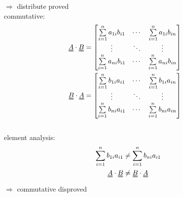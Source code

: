 \documentclass{article}
\begin{document}
$\Rightarrow$ distribute proved
\\[20pt]
commutative:
\begin{equation}\notag
\begin{aligned}
\uuline{A}\cdot\uuline{B} &=
\begin{bmatrix} 
\sum\limits_{i=1}^{n} a_{1i}b_{i1}&\cdots& \sum\limits_{i=1}^{n} a_{1i}b_{in}\\
\vdots&\ddots&\vdots\\
\sum\limits_{i=1}^{n} a_{ni}b_{i1}&\cdots& \sum\limits_{i=1}^{n} a_{ni}b_{in}
\end{bmatrix} 
\quad
\\
\uuline{B}\cdot\uuline{A} &=
\begin{bmatrix} 
\sum\limits_{i=1}^{n} b_{1i}a_{i1}&\cdots& \sum\limits_{i=1}^{n} b_{1i}a_{in}\\
\vdots&\ddots&\vdots\\
\sum\limits_{i=1}^{n} b_{ni}a_{i1}&\cdots& \sum\limits_{i=1}^{n} b_{ni}a_{in}
\end{bmatrix} 
\quad
\end{aligned}
\end{equation}
\\
element analysis:
\begin{equation}\notag
\begin{aligned}
\sum\limits_{i=1}^{n} b_{1i}a_{i1} &\neq \sum\limits_{i=1}^{n} b_{ni}a_{i1}
\\
\uuline{A}\cdot\uuline{B} &\neq \uuline{B}\cdot\uuline{A} 
\end{aligned}
\end{equation}
$\Rightarrow$ commutative disproved
\newpage
\end{document}

